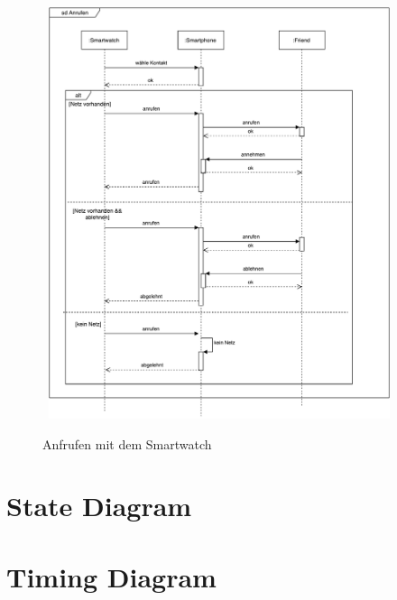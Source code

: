 \begin{figure}[H]
\centering\
\includegraphics[width=10cm]{img/AnrufenSequenz}
\caption{Anfrufen mit dem Smartwatch}\label{fig:anruf}
\end{figure}



\section{State Diagram}

\section{Timing Diagram}

